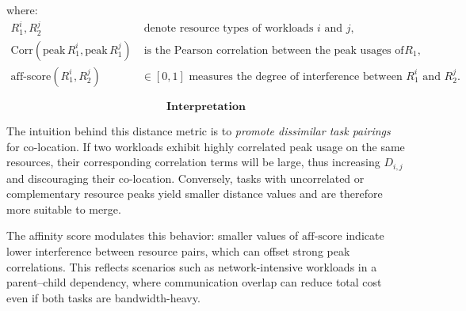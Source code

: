 \begin{enumerate}
          where:
          \begin{align}
              R_1^i, R_2^j & \; \text{denote resource types of workloads } i \text{ and } j,                           \\[4pt]
              \mathrm{Corr}(\mathrm{peak}\,R_1^i, \mathrm{peak}\,R_1^j)
                           & \; \text{is the Pearson correlation between the peak usages of resource } R_1,            \\[4pt]
              \mathrm{aff\text{-}score}(R_1^i, R_2^j)
                           & \in [0, 1] \text{ measures the degree of interference between } R_1^i \text{ and } R_2^j.
          \end{align}

          \[
              \textbf{Interpretation}
          \]

          The intuition behind this distance metric is to
          \emph{promote dissimilar task pairings} for co-location.
          If two workloads exhibit highly correlated peak usage on the same resources,
          their corresponding correlation terms will be large,
          thus increasing \( D_{i,j} \) and discouraging their co-location.
          Conversely, tasks with uncorrelated or complementary resource peaks
          yield smaller distance values and are therefore more suitable to merge.

          The affinity score modulates this behavior:
          smaller values of \( \mathrm{aff\text{-}score} \)
          indicate lower interference between resource pairs,
          which can offset strong peak correlations.
          This reflects scenarios such as network-intensive workloads in a
          parent–child dependency, where communication overlap can reduce total cost
          even if both tasks are bandwidth-heavy.


\end{enumerate}
